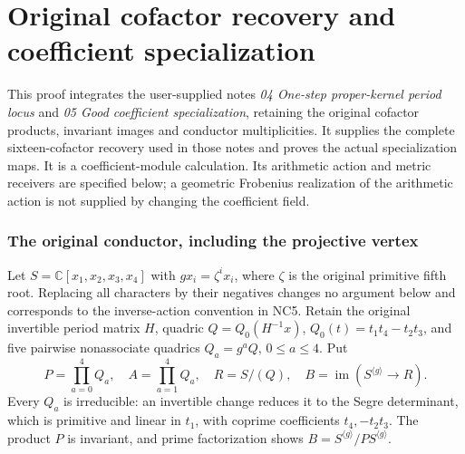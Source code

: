 \endgroup

\clearpage\begingroup
\part*{Original cofactor recovery and coefficient specialization}
\newcommand{\pcofactorC}{\mathbb C}
\newcommand{\pcofactorim}{\operatorname{im}}
\newcommand{\pcofactorSpec}{\operatorname{Spec}}
\newcommand{\pcofactordiag}{\operatorname{diag}}


This proof integrates the user-supplied notes
\emph{04 One-step proper-kernel period locus} and
\emph{05 Good coefficient specialization}, retaining the original
cofactor products, invariant images and conductor multiplicities.
It supplies the complete sixteen-cofactor recovery used in those notes
and proves the actual specialization maps. It is a coefficient-module
calculation. Its arithmetic action and metric receivers are specified
below; a geometric Frobenius realization of the arithmetic action is
not supplied by changing the coefficient field.

\section{The original conductor, including the projective vertex}
Let $S=\pcofactorC[x_1,x_2,x_3,x_4]$ with
$g x_i=\zeta^i x_i$, where $\zeta$ is the original primitive fifth
root. Replacing all characters by their negatives changes no argument
below and corresponds to the inverse-action convention in NC5.
Retain the original invertible period matrix $H$, quadric
$Q=Q_0(H^{-1}x)$, $Q_0(t)=t_1t_4-t_2t_3$, and five pairwise
nonassociate quadrics $Q_a=g^aQ$, $0\le a\le4$. Put
\[
 P=\prod_{a=0}^4Q_a,\quad A=\prod_{a=1}^4Q_a,\quad
 R=S/(Q),\quad B=\pcofactorim(S^{\langle g\rangle}\to R).
                                                                    \tag{CP1}
\]
Every $Q_a$ is irreducible: an invertible change reduces it to the
Segre determinant, which is primitive and linear in $t_1$, with
coprime coefficients $t_4,-t_2t_3$. The product $P$ is invariant,
and prime factorization shows
$B=S^{\langle g\rangle}/P S^{\langle g\rangle}$.

